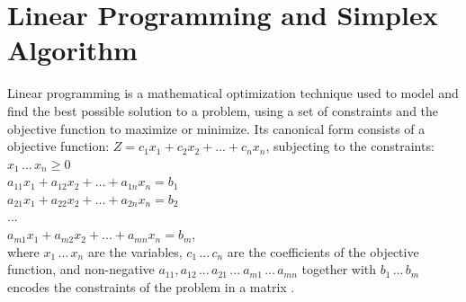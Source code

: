 \documentclass[logo,bsc,singlespacing,parskip]{infthesis}
\begin{document}
\section{Linear Programming and Simplex Algorithm}
\label{simplex}
Linear programming is a mathematical optimization technique used to model and
find the best possible solution to a problem, using a set of constraints and 
the objective function to maximize or minimize. Its canonical form consists of a
objective function:
\begin{math}
Z = c_1x_1 + c_2x_2 + ... + c_nx_n
\end{math}, subjecting to the constraints: \\
\begin{math}
x_1 \, ... \, x_n \ge 0
\end{math}\\
\begin{math}
a_{11}x_1 + a_{12}x_2 + ... + a_{1n}x_n = b_1 
\end{math}\\
\begin{math}
a_{21}x_1 + a_{22}x_2 + ... + a_{2n}x_n = b_2
\end{math}\\
\begin{math}
...
\end{math}\\
\begin{math}
a_{m1}x_1 + a_{m2}x_2 + ... + a_{mn}x_n = b_m
\end{math}, \\
where \begin{math}x_1 \,...\, x_n\end{math} are the variables, 
\begin{math}c_1 \,...\, c_n\end{math} are the coefficients of the objective function, 
and non-negative \begin{math}a_{11}, a_{12} \,...\, a_{21} \,...\ a_{m1} \,...\, a_{mn}\end{math}
together with \begin{math}b_1 \,...\, b_m\end{math} encodes the constraints of
the problem in a matrix \cite{FPL1}. 

    
\end{document}
